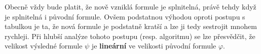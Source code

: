 Obecně vždy bude platit, že nově vzniklá formule je splnitelná, právě tehdy když je splnitelná i původní formule. Ovšem podstatnou výhodou oproti postupu s tabulkou je ta, že nová formule je podstatně kratší a lze ji tedy sestrojit mnohem rychleji.
Při hlubší analýze tohoto postupu (resp. algoritmu) se lze přesvědčit, že velikost výsledné formule $\psi$ je \textbf{lineární} ve velikosti původní formule $\varphi$.
